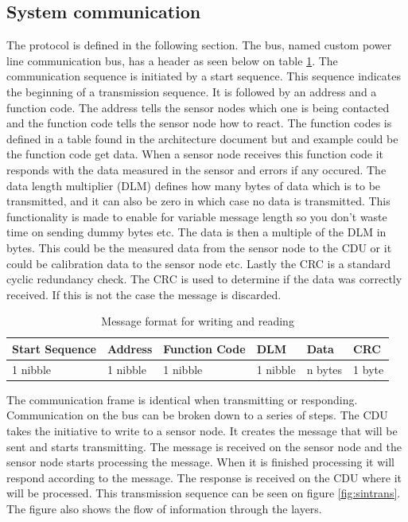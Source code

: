 \subsection{System communication}
The protocol is defined in the following section. The bus, named custom power line communication bus, has a header as seen below on table \ref{table:stdmsgtosensor}. The communication sequence is initiated by a start sequence. This sequence indicates the beginning of a transmission sequence. It is followed by an address and a function code. The address tells the sensor nodes which one is being contacted and the function code tells the sensor node how to react. The function codes is defined in a table found in the architecture document but and example could be the function code get data. When a sensor node receives this function code it responds with the data measured in the sensor and errors if any occured. The data length multiplier (DLM) defines how many bytes of data which is to be transmitted, and it can also be zero in which case no data is transmitted. This functionality is made to enable for variable message length so you don't waste time on sending dummy bytes etc. The data is then a multiple of the DLM in bytes. This could be the measured data from the sensor node to the CDU or it could be calibration data to the sensor node etc. Lastly the CRC is a standard cyclic redundancy check. The CRC is used to determine if the data was correctly received. If this is not the case the message is discarded. 
\begin{table}[hbpt]
	\centering
	\begin{tabular}{|l|l|l|l|l|l|}
		\hline
		Start Sequence & Address & Function Code & DLM & Data & CRC  \\ \hline
		1 nibble & 1 nibble	& 1 nibble & 1 nibble & n bytes & 1 byte\\
		\hline
	\end{tabular}
	\caption{Message format for writing and reading}
	\label{table:stdmsgtosensor}
\end{table}
The communication frame is identical when transmitting or responding. Communication on the bus can be broken down to a series of steps. The CDU takes the initiative to write to a sensor node. It creates the message that will be sent and starts transmitting. The message is received on the sensor node and the sensor node starts processing the message. When it is finished processing it will respond according to the message. The response is received on the CDU where it will be processed. This transmission sequence can be seen on figure \ref{fig:sintrans}. The figure also shows the flow of information through the layers. 
